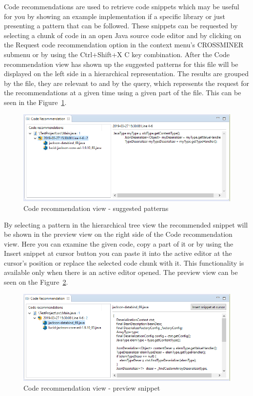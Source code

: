 \documentclass[11pt,a4paper]{book}
\begin{document}
Code recommendations are used to retrieve code snippets which may be useful for you by showing an example implementation if a specific library or just presenting a pattern that can be followed. These snippets can be requested by selecting a chunk of code in an open Java source code editor and by clicking on the Request code recommendation option in the context menu's CROSSMINER submenu or by using the Ctrl+Shift+X C key combination. After the Code recommendation view has shown up the suggested patterns for this file will be displayed on the left side in a hierarchical representation. The results are grouped by the file, they are relevant to and by the query, which represents the request for the recommendations at a given time using a given part of the file. This can be seen in the Figure~\ref{fig:codeRecommendation:results}.

\begin{figure}[h]
	\centering
	\includegraphics[width=\linewidth]{pic/code-recommendation-results.png}
	\caption{Code recommendation view - suggested patterns }
	\label{fig:codeRecommendation:results}
\end{figure}

By selecting a pattern in the hierarchical tree view the recommended snippet will be shown in the preview view on the right side of the Code recommendation view. Here you can examine the given code, copy a part of it or by using the Insert snippet at cursor button you can paste it into the active editor at the cursor's position or replace the selected code chunk with it. This functionality is available only when there is an active editor opened. The preview view can be seen on the Figure~\ref{fig:codeRecommendation:preview}.

\begin{figure}[h]
	\centering
	\includegraphics[width=\linewidth]{pic/code-recommendation-preview.png}
	\caption{Code recommendation view - preview snippet }
	\label{fig:codeRecommendation:preview}
\end{figure}
\end{document}

